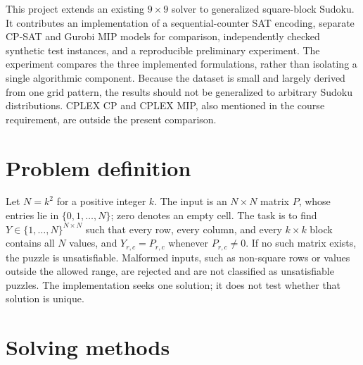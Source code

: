 \documentclass[a4paper,fleqn]{cas-sc}
\begin{document}
This project extends an existing \(9\times9\) solver to generalized square-block Sudoku. It contributes an implementation of a sequential-counter SAT encoding, separate CP-SAT and Gurobi MIP models for comparison, independently checked synthetic test instances, and a reproducible preliminary experiment. The experiment compares the three implemented formulations, rather than isolating a single algorithmic component. Because the dataset is small and largely derived from one grid pattern, the results should not be generalized to arbitrary Sudoku distributions. CPLEX CP and CPLEX MIP, also mentioned in the course requirement, are outside the present comparison.

\section{Problem definition}
Let \(N=k^2\) for a positive integer \(k\). The input is an \(N\times N\) matrix \(P\), whose entries lie in \(\{0,1,\ldots,N\}\); zero denotes an empty cell. The task is to find \(Y\in\{1,\ldots,N\}^{N\times N}\) such that every row, every column, and every \(k\times k\) block contains all \(N\) values, and \(Y_{r,c}=P_{r,c}\) whenever \(P_{r,c}\ne0\). If no such matrix exists, the puzzle is unsatisfiable. Malformed inputs, such as non-square rows or values outside the allowed range, are rejected and are not classified as unsatisfiable puzzles. The implementation seeks one solution; it does not test whether that solution is unique.

\section{Solving methods}
\end{document}
